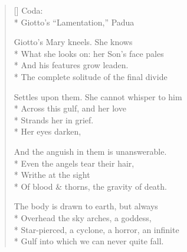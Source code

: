\begin{verse}[\versewidth]
Coda:\\*
Giotto's ``Lamentation,'' Padua

Giotto's Mary kneels. She knows\\*
What she looks on: her Son's face pales\\*
And his features grow leaden.\\*
The complete solitude of the final divide

Settles upon them. She cannot whisper to him\\*
Across this gulf, and her love\\*
Strands her in grief.\\*
Her eyes darken,

And the anguish in them is unanswerable.\\*
Even the angels tear their hair,\\*
Writhe at the sight\\*
Of blood \& thorns, the gravity of death.

The body is drawn to earth, but always\\*
Overhead the sky arches, a goddess,\\*
Star-pierced, a cyclone, a horror, an infinite\\*
Gulf into which we can never quite fall.
\end{verse}
